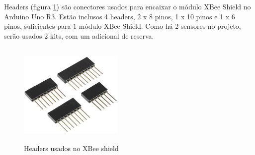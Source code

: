 Headers (figura \ref{fig:xbee shield headers}) são conectores usados para encaixar o módulo XBee Shield no Arduino Uno R3. Estão inclusos 4 headers, 2 x 8 pinos, 1 x 10 pinos e 1 x 6 pinos, suficientes para 1 módulo XBee Shield. Como há 2 sensores no projeto, serão usados 2 kits, com um adicional de reserva.

\begin{figure}[H]
\begin{center}
\includegraphics[width=5cm,height=5cm,keepaspectratio]{figuras/headers.png}
\caption{\label{fig:xbee shield headers} Headers usados no XBee shield}
\end{center}
\end{figure}

